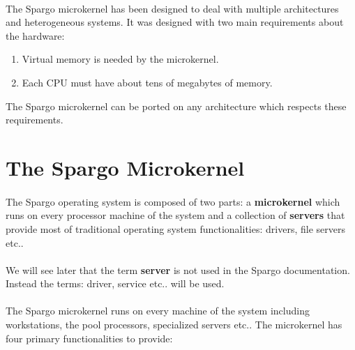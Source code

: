 \documentclass[10pt,a4wide]{article}
\begin{document}
\begin{multicols}{2}
\paragraph{}

The Spargo microkernel has been designed to deal with multiple architectures
and heterogeneous systems. It was designed with two main requirements about the
hardware:

\begin{enumerate}

\item Virtual memory is needed by the microkernel.

\item Each CPU must have about tens of megabytes of memory.

\end{enumerate}

The Spargo microkernel can be ported on any architecture which respects these
requirements.



\section{The Spargo Microkernel}

\paragraph{}

The Spargo operating system is composed of two parts: a \textbf{microkernel}
which runs on every processor machine of the system and a collection of
\textbf{servers} that provide most of traditional operating system
functionalities: drivers, file servers etc..

\paragraph{}

We will see later that the term \textbf{server} is not used in the Spargo
documentation. Instead the terms: driver, service etc.. will be used.

\paragraph{}

The Spargo microkernel runs on every machine of the system including
workstations, the pool processors, specialized servers etc.. The microkernel
has four primary functionalities to provide:


\end{multicols}
\end{document}
